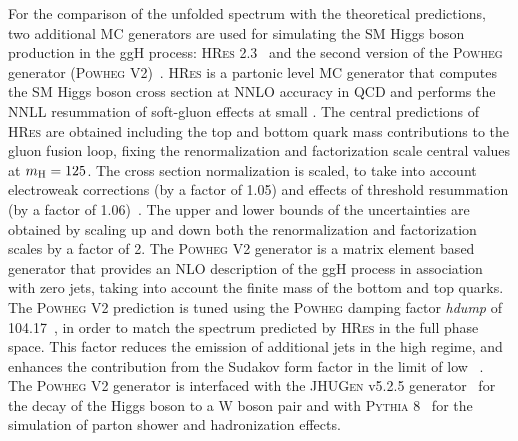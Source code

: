 For the comparison of the unfolded spectrum with the theoretical predictions, two additional MC generators are used for simulating the SM Higgs boson production in the ggH process: \textsc{HRes} 2.3~\cite{deFlorian:2012mx,Grazzini:2013mca} and the second version of the \textsc{Powheg} generator (\textsc{Powheg V2})~\cite{Bagnaschi:2011tu}.
\textsc{HRes} is a partonic level MC generator that computes the SM Higgs
boson cross section at NNLO accuracy in QCD and performs the NNLL
resummation of soft-gluon effects at small \pt. The central predictions of
\textsc{HRes} are obtained including the top and bottom quark mass contributions to
the gluon fusion loop, fixing the renormalization and factorization scale central values at $m_{\rm H}=125$\GeV. The cross section normalization is scaled, to take into account electroweak corrections (by a factor of 1.05) and effects of threshold resummation (by a factor of 1.06)~\cite{Actis:2008ug,Catani:2003zt}. The upper and lower bounds of the uncertainties are obtained by scaling up and down both the renormalization and factorization scales by a factor of 2.
The \textsc{Powheg V2} generator is a matrix element based generator that provides an NLO description of the ggH process in association with zero jets, taking into account the finite mass of the bottom and top quarks.
The \textsc{Powheg V2} prediction is tuned using the \textsc{Powheg} damping factor \textit{hdump} of 104.17~\GeV, in order to match the \pth{} spectrum predicted by \textsc{HRes} in the full phase space. This factor reduces the emission of additional jets in the high \pt regime, and enhances the contribution from the Sudakov form factor in the limit of low \pt~\cite{Bagnaschi:2011tu}.
The \textsc{Powheg V2} generator is interfaced with the \textsc{JHUGen} v5.2.5 generator~\cite{Gao:2010qx,Bolognesi:2012mm,Anderson:2013afp} for the decay of the Higgs boson to a W boson pair and with \textsc{Pythia 8}~\cite{Sjostrand:2007gs} for the simulation of parton shower and hadronization effects.
